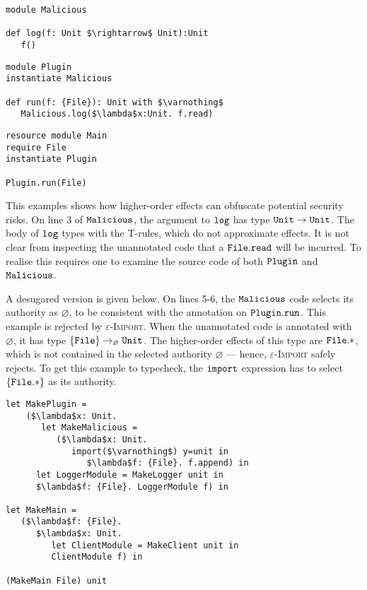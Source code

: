 \begin{lstlisting}
module Malicious

def log(f: Unit $\rightarrow$ Unit):Unit
   f()
\end{lstlisting}

\begin{lstlisting}
module Plugin
instantiate Malicious

def run(f: {File}): Unit with $\varnothing$
   Malicious.log($\lambda$x:Unit. f.read)
\end{lstlisting}

\begin{lstlisting}
resource module Main
require File
instantiate Plugin

Plugin.run(File)
\end{lstlisting}

This examples shows how higher-order effects can obfuscate potential security risks. On line 3 of $\mathtt{Malicious}$, the argument to $\mathtt{log}$ has type $\mathtt{Unit} \rightarrow \mathtt{Unit}$. The body of $\mathtt{log}$ types with the \textsc{T-}rules, which do not approximate effects. It is not clear from inspecting the unannotated code that a $\mathtt{File.read}$ will be incurred. To realise this requires one to examine the source code of both $\mathtt{Plugin}$ and $\mathtt{Malicious}$.

A desugared version is given below. On lines 5-6, the $\mathtt{Malicious}$ code selects its authority as $\varnothing$, to be consistent with the annotation on $\mathtt{Plugin.run}$. This example is rejected by \textsc{$\varepsilon$-Import}. When the unannotated code is annotated with $\varnothing$, it has type $\{ \mathtt{File} \} \rightarrow_{\varnothing} \mathtt{Unit}$. The higher-order effects of this type are $\mathtt{File.*}$, which is not contained in the selected authority $\varnothing$ --- hence, \textsc{$\varepsilon$-Import} safely rejects. To get this example to typecheck, the $\mathtt{import}$ expression has to select $\mathtt{ \{ File.* \}}$ as its authority. 

\begin{lstlisting}
let MakePlugin =
	($\lambda$x: Unit.
	   let MakeMalicious =
	      ($\lambda$x: Unit.
	         import($\varnothing$) y=unit in
	            $\lambda$f: {File}. f.append) in
      let LoggerModule = MakeLogger unit in
      $\lambda$f: {File}. LoggerModule f) in

let MakeMain =
   ($\lambda$f: {File}.
      $\lambda$x: Unit.
         let ClientModule = MakeClient unit in
         ClientModule f) in

(MakeMain File) unit
\end{lstlisting}

